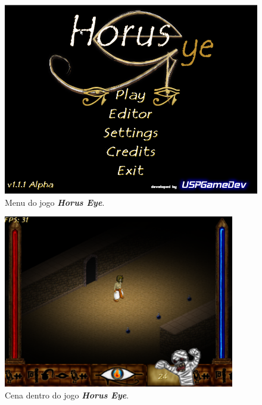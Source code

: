 \documentclass[12pt,onecolumn,a4paper]{article}
\begin{document}
        \begin{figure}[htb]
            \centering
            \includegraphics[width=\textwidth]{images/horus_01.png}
            \caption{Menu do jogo \textit{\textbf{Horus Eye}}.}
            \label{fig:horus_01}
        \end{figure}
        
        \begin{figure}[htb]
            \centering
            \includegraphics[width=0.9\textwidth]{images/horus_02.png}
            \caption{Cena dentro do jogo \textit{\textbf{Horus Eye}}.}
            \label{fig:horus_02}
        \end{figure}
        
\end{document}
